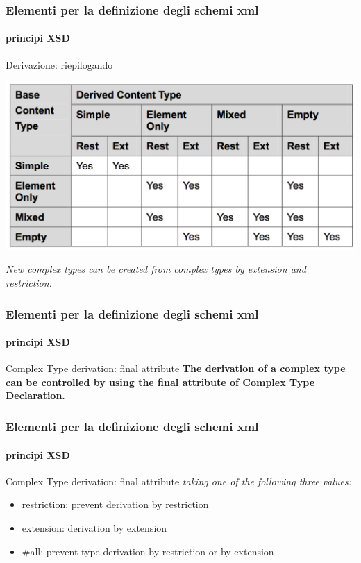 \begin{frame}
	\frametitle{Elementi per la definizione degli schemi xml}
	\framesubtitle{principi XSD}
	\addtocounter{nframe}{1}

	\begin{block}{Derivazione: riepilogando}

		\includegraphics[width=.95\textwidth]{imgs/TabellaContentTypeDerivation.png}

	\end{block}

	\textit{New complex types can be created from complex types by extension and restriction.}
\end{frame}



\begin{frame}
	\frametitle{Elementi per la definizione degli schemi xml}
	\framesubtitle{principi XSD}
	\addtocounter{nframe}{1}

	\begin{block}{Complex Type derivation: final attribute}
		\textbf{The derivation of a complex type can be controlled by using the final attribute of Complex Type Declaration.}
	\end{block}

\end{frame}

\begin{frame}
	\frametitle{Elementi per la definizione degli schemi xml}
	\framesubtitle{principi XSD}
	\addtocounter{nframe}{1}

	\begin{block}{Complex Type derivation: final attribute}
		\textit{taking one of the following three values:}
		\begin{itemize}
			\item restriction: prevent derivation by restriction
			\item extension: derivation by extension
			\item #all: prevent type derivation by restriction or by extension
		\end{itemize}

	\end{block}

\end{frame}

